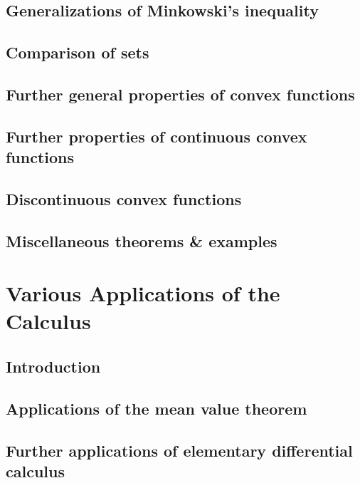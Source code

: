\documentclass[oneside]{book}
\numberwithin{equation}{section}
\begin{document}
\subsection{Generalizations of Minkowski's inequality}

\subsection{Comparison of sets}

\subsection{Further general properties of convex functions}

\subsection{Further properties of continuous convex functions}

\subsection{Discontinuous convex functions}

\subsection{Miscellaneous theorems \& examples}


\section{Various Applications of the Calculus}

\subsection{Introduction}

\subsection{Applications of the mean value theorem}

\subsection{Further applications of elementary differential calculus}
\end{document}
